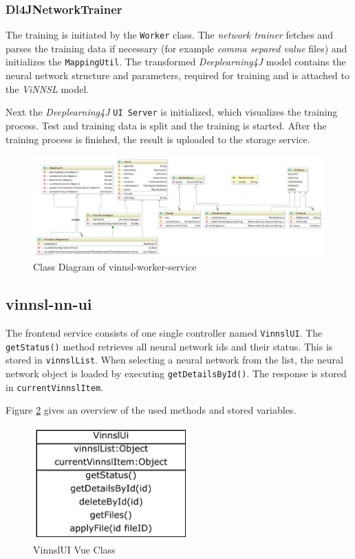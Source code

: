 \subsubsection{Dl4JNetworkTrainer}\label{dl4jnetworktrainer}

The training is initiated by the \texttt{Worker} class. The
\emph{network trainer} fetches and parses the training data if necessary
(for example \emph{comma separed value} files) and initializes the
\texttt{MappingUtil}. The transformed \emph{Deeplearning4J} model
contains the neural network structure and parameters, required for
training and is attached to the \emph{ViNNSL} model.

Next the \emph{Deeplearning4J} \texttt{UI\ Server} is initialized, which
visualizes the training process. Test and training data is split and the
training is started. After the training process is finished, the result
is uploaded to the storage service.

\begin{figure}
\centering
\includegraphics[width=17.00000cm]{images/uml-class-diagram-vinnsl-worker-service}
\caption{Class Diagram of vinnsl-worker-service
\label{class_vinnsl-worker-service}}
\end{figure}

\subsection{vinnsl-nn-ui}\label{vinnsl-nn-ui}

The frontend service consists of one single controller named
\texttt{VinnslUI}. The \texttt{getStatus()} method retrieves all neural
network ids and their status. This is stored in \texttt{vinnslList}.
When selecting a neural network from the list, the neural network object
is loaded by executing \texttt{getDetailsById()}. The response is stored
in \texttt{currentVinnslItem}.

Figure \ref{vinnsl-nn-ui_class} gives an overview of the used methods
and stored variables.

\begin{figure}
\centering
\includegraphics[width=6.00000cm]{images/vinnsl-nn-ui_class}
\caption{VinnslUI Vue Class \label{vinnsl-nn-ui_class}}
\end{figure}

